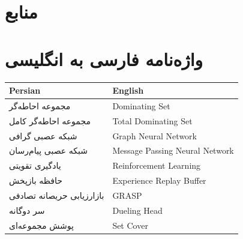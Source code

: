 \documentclass[12pt,a4paper,oneside]{report}
\theoremstyle{definition}
\theoremstyle{plain}
\begin{document}








\chapter*{منابع}
\begin{latin}


\end{latin}

\chapter*{واژه‌نامه فارسی به انگلیسی}
\begin{latin}
\begin{center}
\begin{tabular}{ll}
\toprule
Persian & English \\
\midrule
مجموعه احاطه‌گر & Dominating Set \\
مجموعه احاطه‌گر کامل & Total Dominating Set \\
شبکه عصبی گرافی & Graph Neural Network \\
شبکه عصبی پیام‌رسان & Message Passing Neural Network \\
یادگیری تقویتی & Reinforcement Learning \\
حافظه بازپخش & Experience Replay Buffer \\
بازارزیابی حریصانه تصادفی & GRASP \\
سر دوگانه & Dueling Head \\
پوشش مجموعه‌ای & Set Cover \\
\bottomrule
\end{tabular}
\end{center}
\end{latin}
\end{document}
